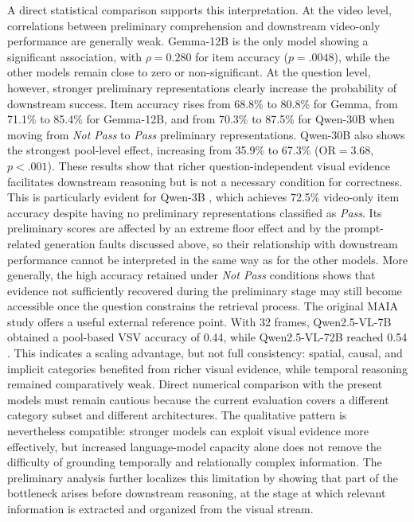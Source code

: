 A direct statistical comparison supports this interpretation. At the video level, correlations between preliminary comprehension and downstream video-only performance are generally weak. Gemma-12B is the only model showing a significant association, with $\rho=0.280$ for item accuracy ($p=.0048$), while the other models remain close to zero or non-significant. At the question level, however, stronger preliminary representations clearly increase the probability of downstream success. Item accuracy rises from 68.8\% to 80.8\% for Gemma, from 71.1\% to 85.4\% for Gemma-12B, and from 70.3\% to 87.5\% for Qwen-30B when moving from \textit{Not Pass} to \textit{Pass} preliminary representations. Qwen-30B also shows the strongest pool-level effect, increasing from 35.9\% to 67.3\% ($\mathrm{OR}=3.68$, $p<.001$).
These results show that richer question-independent visual evidence facilitates downstream reasoning but is not a necessary condition for correctness. This is particularly evident for Qwen-3B , which achieves 72.5\% video-only item accuracy despite having no preliminary representations classified as \textit{Pass}. Its preliminary scores are affected by an extreme floor effect and by the prompt-related generation faults discussed above, so their relationship with downstream performance cannot be interpreted in the same way as for the other models. More generally, the high accuracy retained under \textit{Not Pass} conditions shows that evidence not sufficiently recovered during the preliminary stage may still become accessible once the question constrains the retrieval process.
The original MAIA study offers a useful external reference point. With 32 frames, Qwen2.5-VL-7B obtained a pool-based VSV accuracy of 0.44, while Qwen2.5-VL-72B reached 0.54 \cite{testa2025maia}. This indicates a scaling advantage, but not full consistency: spatial, causal, and implicit categories benefited from richer visual evidence, while temporal reasoning remained comparatively weak. Direct numerical comparison with the present models must remain cautious because the current evaluation covers a different category subset and different architectures. The qualitative pattern is nevertheless compatible: stronger models can exploit visual evidence more effectively, but increased language-model capacity alone does not remove the difficulty of grounding temporally and relationally complex information. The preliminary analysis further localizes this limitation by showing that part of the bottleneck arises before downstream reasoning, at the stage at which relevant information is extracted and organized from the visual stream.
